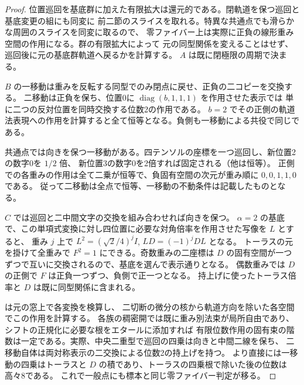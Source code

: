\begin{proof}
位置巡回を基底群に加えた有限拡大は還元的である。閉軌道を保つ巡回と基底変更の組にも同変に
前二節のスライスを取れる。特異な共通点でも滑らかな周囲のスライスを同変に取るので、
零ファイバー上は実際に正負の線形重み空間の作用になる。群の有限拡大によって
元の同型関係を変えることはせず、巡回後に元の基底群軌道へ戻るかを計算する。
$A$ は既に閉極限の周期で決まる。

$B$ の一移動は重みを反転する同型でのみ閉点に戻せ、正負の二コピーを交換する。
二移動は正負を保ち、位置0に $\operatorname{diag}(b,1,1,1)$ を作用させた表示では
単に二つの反対位置を同時交換する位数2の作用である。
$b=2$ でその正側の軌道法表現への作用を計算すると全て恒等となる。負側も一移動による共役で同じである。

共通点では向きを保つ一移動がある。四テンソルの座標を一つ巡回し、新位置2の数字0を $1/2$ 倍、
新位置3の数字0を2倍すれば固定される（他は恒等）。
正側での各重みの作用は全て二乗が恒等で、負固有空間の次元が重み順に $0,0,1,1,0$ である。
従って二移動は全点で恒等、一移動の不動条件は記載したものとなる。

$C$ では巡回と二中間文字の交換を組み合わせれば向きを保つ。
$\alpha=2$ の基底で、この単項式変換に対し四位置に必要な対角倍率を作用させた写像を $L$ とすると、
重み $j$ 上で $L^2=(\sqrt{2}/4)^j I$, $LD=(-1)^j DL$ となる。
トーラスの元を掛けて全重みで $F^2=1$ にできる。奇数重みの二座標は
$D$ の固有空間が一つずつで互いに交換されるので、基底を選んで表示通りとなる。
偶数重みでは $D$ の正側で $F$ は正負一つずつ、負側で正一つとなる。
持上げに使ったトーラス倍率と $D$ は既に同型関係に含まれる。

 は元の窓上で各変換を検算し、
二切断の微分の核から軌道方向を除いた各空間でこの作用を計算する。
各族の稠密開では既に重み別法束が局所自由であり、シフトの正規化に必要な根をエタールに添加すれば
有限位数作用の固有束の階数は一定である。実際、中央二重型で巡回の四乗は向きと中間二線を保ち、
二移動自体は両対称表示の二交換による位数2の持上げを持つ。
より直接には一移動の四乗はトーラスと $D$ の積であり、トーラスの四乗根で除いた後の位数は高々8である。
これで一般点にも標本と同じ零ファイバー判定が移る。
\end{proof}
